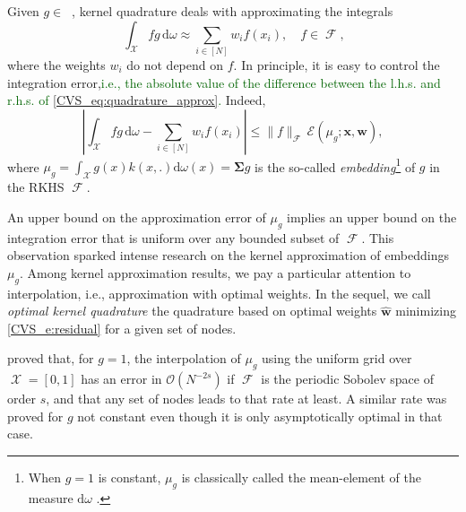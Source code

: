\documentclass[twoside,11pt]{book}
\newcommand{\rev}[1]{\textcolor{darkgreen}{#1}}
\numberwithin{theorem}{chapter}
\numberwithin{definition}{chapter}
\numberwithin{proposition}{chapter}
\numberwithin{corollary}{chapter}
\numberwithin{example}{chapter}
\numberwithin{lemma}{chapter}
\DeclareMathOperator{\F}{\mathcal{F}}
\DeclareMathOperator{\X}{\mathcal{X}}
\DeclareMathOperator{\Ltwo}{\mathbb{L}_{2}(\mathrm{d} \omega)}
\newcommand{\rb}[1]{\textcolor{magenta}{#1}}
\begin{document}
Given $g \in \Ltwo$, kernel quadrature deals with approximating the integrals
\begin{equation}\label{CVS_eq:quadrature_approx}
\:\int_{\X} fg \,\mathrm{d}\omega \approx \sum\limits_{i \in [N]} w_{i}f(x_{i}),\quad f\in\F,
\end{equation}
where the weights $w_{i}$ do not depend on $f$.
In principle, it is easy to control the integration error,\rev{i.e., the absolute value of the difference between the l.h.s. and r.h.s. of \eqref{CVS_eq:quadrature_approx}.} Indeed,
\begin{equation}\label{CVS_eq:upper_bound_integration_error}
\left| \int_{\X} fg \,\mathrm{d}\omega - \sum_{i \in [N]} w_{i}f(x_{i})\right| \leq \|f\|_{\F} \, \mathcal{E}(\mu_{g};\bm{x},\bm{w}),
\end{equation}
where
$ \displaystyle
\mu_{g} = \int_{\X}g(x)k(x,.) \mathrm{d}\omega(x){=\bm{\Sigma} g}
$
is the so-called \emph{embedding}\footnote{When $g =1$ is constant, $\mu_{g}$ is classically called the mean-element of the measure $\mathrm{d} \omega$ \citep{SmGrSoSc07}.} of $g$ in the RKHS $\F$.

An upper bound on the approximation error of $\mu_{g}$ implies an upper bound on the integration error that is uniform over any bounded subset of $\F$. This observation sparked intense research on the kernel approximation of embeddings $\mu_{g}$. Among kernel approximation results, we pay a particular attention to interpolation, i.e., approximation with optimal weights. In the sequel, we call \emph{optimal kernel quadrature} the quadrature based on optimal weights $\hat{\bm{w}}$ minimizing \eqref{CVS_e:residual} for a given set of nodes.

\cite{Boj81} proved that, for $g=1$, the interpolation of $\mu_{g}$ using the uniform grid over $\X = [0,1]$ has an error in $\mathcal{O}(N^{-2s})$ if $\F$ is the periodic Sobolev space of order $s$, and that any set of nodes leads to that rate at least. A similar rate was proved for $g$ not constant \citep{NoUlWo15} even though it is only asymptotically optimal in that case.
\end{document}
